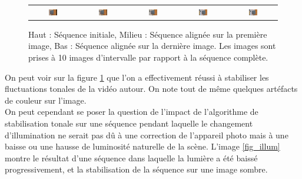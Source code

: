 \begin{figure}[H]
\begin{tabular}{ccccc}
\includegraphics[width = 0.2\textwidth]{Chapters/Images/Seq_warm/1}&
\includegraphics[width = 0.2\textwidth]{Chapters/Images/Seq_warm/2}&
\includegraphics[width = 0.2\textwidth]{Chapters/Images/Seq_warm/3}&
\includegraphics[width = 0.2\textwidth]{Chapters/Images/Seq_warm/4}&
\includegraphics[width = 0.2\textwidth]{Chapters/Images/Seq_warm/5}
\end{tabular}
\caption{Haut : Séquence initiale, Milieu : Séquence alignée sur la première image, Bas : Séquence alignée sur la dernière image. Les images sont prises à 10 images d'intervalle par rapport à la séquence complète.}
\label{fig_gray}
\end{figure}

On peut voir sur la figure \ref{fig_gray} que l'on a effectivement réussi à stabiliser les fluctuations tonales de la vidéo autour. On note tout de même quelques artéfacts de couleur sur l'image.\\

On peut cependant se poser la question de l'impact de l'algorithme de stabilisation tonale sur une séquence pendant laquelle le changement d'illumination ne serait pas dû à une correction de l'appareil photo mais à une baisse ou une hausse de luminosité naturelle de la scène. L'image \ref{fig_illum} montre le résultat d'une séquence dans laquelle la lumière a été baissé progressivement, et la stabilisation de la séquence sur une image sombre. \\


